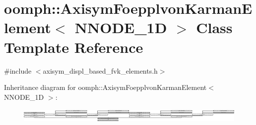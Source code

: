 \hypertarget{classoomph_1_1AxisymFoepplvonKarmanElement}{}\section{oomph\+:\+:Axisym\+Foepplvon\+Karman\+Element$<$ N\+N\+O\+D\+E\+\_\+1D $>$ Class Template Reference}
\label{classoomph_1_1AxisymFoepplvonKarmanElement}


{\ttfamily \#include $<$axisym\+\_\+displ\+\_\+based\+\_\+fvk\+\_\+elements.\+h$>$}

Inheritance diagram for oomph\+:\+:Axisym\+Foepplvon\+Karman\+Element$<$ N\+N\+O\+D\+E\+\_\+1D $>$\+:\begin{figure}[H]
\begin{center}
\leavevmode
\includegraphics[height=0.714894cm]{classoomph_1_1AxisymFoepplvonKarmanElement}
\end{center}
\end{figure}
